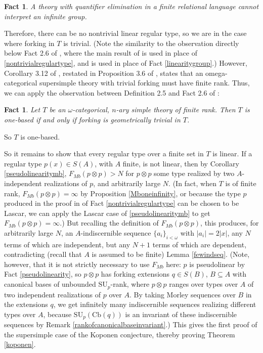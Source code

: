 \documentclass[11pt]{amsart}
\newtheorem{fact}[theorem]{Fact}
\theoremstyle{definition}
\theoremstyle{remark}
\numberwithin{equation}{section}
\begin{document}
\begin{fact}\label{nogroup}
    A theory with quantifier elimination in a finite relational language cannot interpret an infinite group.
\end{fact}
Therefore, there can be no nontrivial linear regular type, so we are in the case where forking in $T$ is trivial. (Note the similarity to the observation directly below Fact 2.6 of \cite{Kop17}, where the main result of \cite{HKP00} is used in place of \ref{nontrivialregulartype}, and \cite{DPK03} is used in place of Fact \ref{linearitygroup}.) However, Corollary 3.12 of \cite{Pal17}, restated in Proposition 3.6 of \cite{Kop19}, states that an omega-categorical supersimple theory with trivial forking must have finite rank. Thus, we can apply the observation between Definition 2.5 and Fact 2.6 of \cite{Kop17}:

\begin{fact}\label{onebasedminimal}
Let $T$ be an $\omega$-categorical, $n$-ary simple theory of finite rank. Then $T$ is one-based if and only if forking is geometrically trivial in $T$.

\end{fact}

So $T$ is one-based.

So it remains to show that every regular type over a finite set in $T$ is linear. If a regular type $p(x) \in S(A)$, with $A$ finite, is not linear, then by Corollary \ref{pseudolinearitymb}, $F_{Mb}(p\otimes p) > N$ for $p \otimes p$ some type realized by two $A$-independent realizations of $p$, and arbitrarily large $N$. (In fact, when $T$ is of finite rank, $F_{Mb}(p\otimes p) = \infty$ by Proposition \ref{Mboneinfinity}, or because the type $p$ produced in the proof in \cite{Kop17} of Fact \ref{nontrivialregulartype} can be chosen to be Lascar, we can apply the Lascar case of \ref{pseudolinearitymb} to get $F_{Mb}(p\otimes p) = \infty$.) But recalling the definition of $F_{Mb}(p\otimes p) $, this produces, for arbitrarily large $N$, an $A$-indiscernible sequence $\{a_{i}\}_{i < \omega}$ with $|a_{i}| = 2|x|$, any $N$ terms of which are independent, but any $N + 1$ terms of which are dependent, contradicting (recall that $A$ is assumed to be finite) Lemma \ref{fewindseq}. (Note, however, that it is not strictly necessary to use $F_{Mb}$ here: $p$ is pseudolinear by Fact \ref{pseudolinearity}, so $p\otimes p$ has forking extensions $q\in S(B)$, $B \subseteq A$ with canonical bases of unbounded $\mathrm{SU}_{p}$-rank, where $p \otimes p$ ranges over types over $A$ of two independent realizations of $p$ over $A$. By taking Morley sequences over $B$ in the extensions $q$, we get infinitely many indiscernible sequences realizing different types over $A$, because $\mathrm{SU}_{p}(\mathrm{Cb}(q))$ is an invariant of these indiscernible sequences by Remark \ref{rankofcanonicalbaseinvariant}.) This gives the first proof of the supersimple case of the Koponen conjecture, thereby proving Theorem \ref{koponen}.
\end{document}
